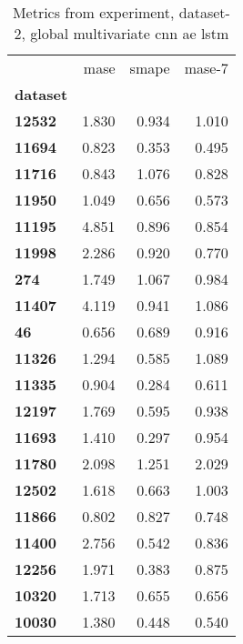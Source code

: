 \begin{table}[h]
\centering
\caption{Metrics from experiment, dataset-2, global multivariate cnn ae lstm}
\label{table:global-multivariate-cnn-ae-lstm-dataset-2}
\begin{tabular}{lrrr}
\toprule
{} &   mase &  smape &  mase-7 \\
\textbf{dataset} &        &        &         \\
\midrule
\textbf{12532  } &  1.830 &  0.934 &   1.010 \\
\textbf{11694  } &  0.823 &  0.353 &   0.495 \\
\textbf{11716  } &  0.843 &  1.076 &   0.828 \\
\textbf{11950  } &  1.049 &  0.656 &   0.573 \\
\textbf{11195  } &  4.851 &  0.896 &   0.854 \\
\textbf{11998  } &  2.286 &  0.920 &   0.770 \\
\textbf{274    } &  1.749 &  1.067 &   0.984 \\
\textbf{11407  } &  4.119 &  0.941 &   1.086 \\
\textbf{46     } &  0.656 &  0.689 &   0.916 \\
\textbf{11326  } &  1.294 &  0.585 &   1.089 \\
\textbf{11335  } &  0.904 &  0.284 &   0.611 \\
\textbf{12197  } &  1.769 &  0.595 &   0.938 \\
\textbf{11693  } &  1.410 &  0.297 &   0.954 \\
\textbf{11780  } &  2.098 &  1.251 &   2.029 \\
\textbf{12502  } &  1.618 &  0.663 &   1.003 \\
\textbf{11866  } &  0.802 &  0.827 &   0.748 \\
\textbf{11400  } &  2.756 &  0.542 &   0.836 \\
\textbf{12256  } &  1.971 &  0.383 &   0.875 \\
\textbf{10320  } &  1.713 &  0.655 &   0.656 \\
\textbf{10030  } &  1.380 &  0.448 &   0.540 \\
\bottomrule
\end{tabular}
\end{table}
